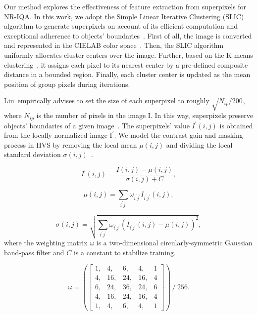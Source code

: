	Our method explores the effectiveness of feature extraction from superpixels for NR-IQA. In this work, we adopt the Simple Linear Iterative Clustering (SLIC) algorithm to generate superpixels on account of its efficient computation and exceptional adherence to objects' boundaries~\citep{achanta2012slic, sun2018spsim, 9198131}. First of all, the image is converted and represented in the CIELAB color space~\citep{achanta2012slic}. Then, the SLIC algorithm uniformly allocates cluster centers over the image. Further, based on the K-means clustering~\citep{duda1973pattern}, it assigns each pixel to its nearest center by a pre-defined composite distance in a bounded region. Finally, each cluster center is updated as the mean position of group pixels during iterations. 
	
	Liu~\etal empirically advises to set the size of each superpixel to roughly $\sqrt{N_{ip} / 200}$, where $N_{ip}$ is the number of pixels in the image $\boldsymbol{\mathrm I}$. In this way, superpixels preserve objects' boundaries of a given image~\citep{liu2013superpixel}. The superpixels' value $I^{\prime}(i, j)$ is obtained from the locally normalized image $\boldsymbol{\mathrm{I^{\prime}}}$. We model the contrast-gain and masking process in HVS by removing the local mean $\mu(i, j)$ and dividing the local standard deviation $\sigma(i, j)$~\citep{ma2017end}.
	
	\begin{equation}
		I^{\prime}(i, j) = \frac{I(i, j) - \mu(i, j)}{\sigma(i, j) + C},
		\label{Normalization}
	\end{equation}
	
	\begin{equation}
		\mu(i, j) = \sum_{i^{\prime} j^{\prime}} \omega_{i^{\prime} j^{\prime}} I_{i^{\prime} j^{\prime}}(i, j),
	\end{equation}
	
	\begin{equation}
		\sigma(i, j)=\sqrt{\sum_{i^{\prime} j^{\prime}} \omega_{i^{\prime} j^{\prime}}\left(I_{i^{\prime} j^{\prime}}(i, j)-\mu(i, j)\right)^{2}},
	\end{equation}
	where the weighting matrix $\boldsymbol{\mathrm{\omega}}$ is a two-dimensional circularly-symmetric Gaussian band-pass filter and $C$ is a constant to stabilize training.
	
	\begin{equation}
		\boldsymbol{\mathrm{\omega}}=
		\left(
			\left[
				\begin{array}{lllll}
					1, & 4, & 6, & 4, & 1 \\
					4, & 16, & 24, & 16, & 4 \\
					6, & 24, & 36, & 24, & 6 \\
					4, & 16, & 24, & 16, & 4 \\
					1, & 4, & 6, & 4, & 1
				\end{array}
			\right]
		\right)~/~256.
	\end{equation}

